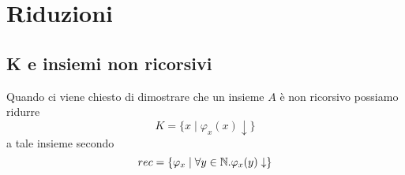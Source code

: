 \section{Riduzioni}

\subsection{K e insiemi non ricorsivi}

Quando ci viene chiesto di dimostrare che un insieme $A$ è non
ricorsivo possiamo ridurre
\[ K = \{ x \mid \varphi_x (x) \downarrow \} \]
a tale insieme secondo
\[ rec = \{ \varphi_x \mid \forall y \in \mathbb{N} . \varphi_x(y) \downarrow \} \]